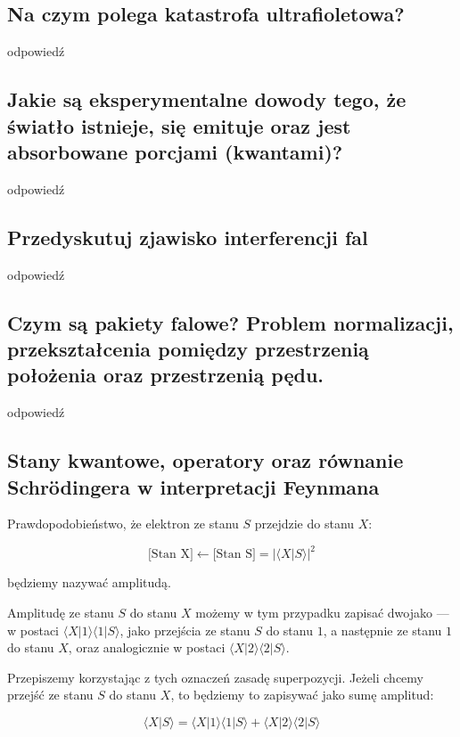 \subsection{Na czym polega katastrofa ultrafioletowa?}

odpowiedź

\subsection{Jakie są eksperymentalne dowody tego, że światło istnieje, się emituje oraz jest absorbowane porcjami (kwantami)?}

odpowiedź

\subsection{Przedyskutuj zjawisko interferencji fal}

odpowiedź

\subsection{Czym są pakiety falowe? Problem normalizacji, przekształcenia pomiędzy przestrzenią położenia oraz przestrzenią pędu.}

odpowiedź

\subsection{Stany kwantowe, operatory oraz równanie Schrödingera w interpretacji Feynmana}

Prawdopodobieństwo, że elektron ze stanu $S$ przejdzie do stanu $X$:

\[
\text{[Stan X]} \leftarrow \text{[Stan S]} = |\langle X|S \rangle|^2
\]

będziemy nazywać amplitudą.

Amplitudę ze stanu $S$ do stanu $X$ możemy w tym przypadku zapisać dwojako — w postaci $\langle X|1 \rangle \langle 1|S \rangle$, jako przejścia ze stanu $S$ do stanu $1$, a następnie ze stanu $1$ do stanu $X$, oraz analogicznie w postaci $\langle X|2 \rangle \langle 2|S \rangle$.

Przepiszemy korzystając z tych oznaczeń zasadę superpozycji. Jeżeli chcemy przejść ze stanu $S$ do stanu $X$, to będziemy to zapisywać jako sumę amplitud:

\[
\langle X|S \rangle = \langle X|1 \rangle \langle 1|S \rangle + \langle X|2 \rangle \langle 2|S \rangle
\]

